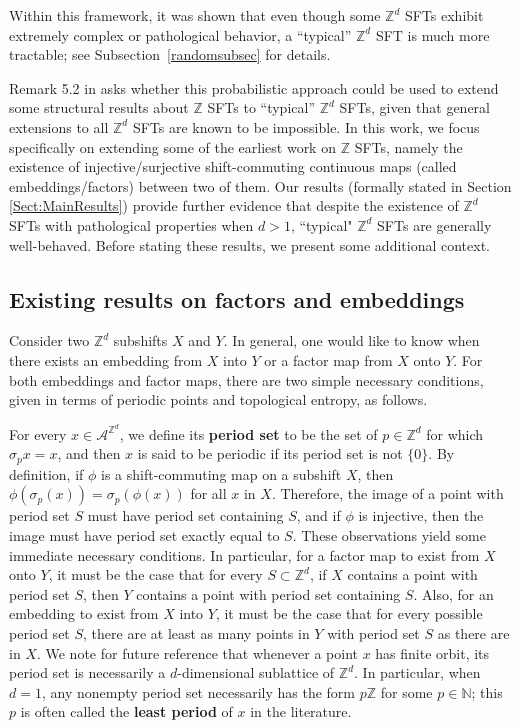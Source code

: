 \documentclass[12pt]{amsart}
\theoremstyle{definition}
\def\N{\mathbb{N}}
\begin{document}
Within this framework, it was shown that even though some $\mathbb{Z}^d$ SFTs exhibit extremely complex or pathological behavior, a 
``typical'' $\mathbb{Z}^d$ SFT is much more tractable; see Subsection~\ref{randomsubsec} for details. 

Remark 5.2 in \cite{McGoffPavlov} asks whether this probabilistic approach could be used to extend some structural results about $\mathbb{Z}$ SFTs to ``typical'' $\mathbb{Z}^d$ SFTs, given that general extensions to all $\mathbb{Z}^d$ SFTs are known to be impossible. In this work, we focus specifically on extending some of the earliest work on $\mathbb{Z}$ SFTs, namely the existence of injective/surjective shift-commuting continuous maps (called embeddings/factors) between two of them. Our results (formally stated in Section \ref{Sect:MainResults}) provide further evidence that despite the existence of $\mathbb{Z}^d$ SFTs with pathological properties when $d>1$, ``typical" $\mathbb{Z}^d$ SFTs are generally well-behaved. Before stating these results, we present some additional context.

\subsection{Existing results on factors and embeddings}

Consider two $\mathbb{Z}^d$ subshifts $X$ and $Y$. In general, one would like to know when there exists an embedding from $X$ into $Y$ or a factor map from $X$ onto $Y$. 
For both embeddings and factor maps, there are two simple necessary conditions, given in terms of periodic points and topological entropy, as follows. 

For every $x \in \mathcal{A}^{\mathbb{Z}^d}$, we define its \textbf{period set} to be the set of $p \in \mathbb{Z}^d$ for which $\sigma_p x = x$, and then $x$ is said to be periodic if its period set is not $\{0\}$. By definition, if $\phi$ is a shift-commuting map on a subshift $X$, then $\phi(\sigma_p(x)) = \sigma_p(\phi(x))$ for all $x$ in $X$. Therefore, the image of a point with period set $S$ must have period set containing $S$, and if $\phi$ is injective, then the image must have period set exactly equal to $S$. These observations yield some immediate necessary conditions. In particular, for a factor map to exist from $X$ onto $Y$, it must be the case that for every $S \subset \mathbb{Z}^d$, if $X$ contains a point with period set $S$, then $Y$ contains a point with period set containing $S$. Also, for an embedding to exist from $X$ into $Y$, it must be the case that for every possible period set $S$, there are at least as many points in $Y$ with period set $S$ as there are in $X$. We note for future reference that whenever a point $x$ has finite orbit, its period set is necessarily a $d$-dimensional sublattice of $\mathbb{Z}^d$. In particular, when $d = 1$, any nonempty period set necessarily has the form $p\mathbb{Z}$ for some $p \in \N$; this $p$ is often called the \textbf{least period} of $x$ in the literature.
\end{document}
